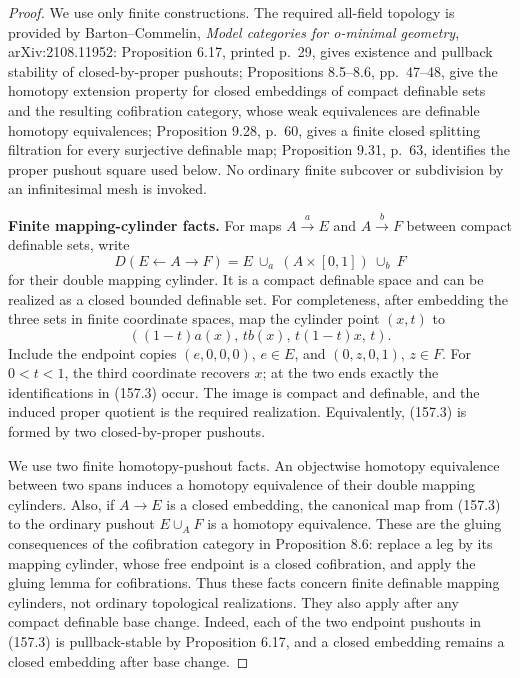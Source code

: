 \begin{proof}
We use only finite constructions. The required all-field topology is provided by Barton--Commelin, \emph{Model categories for o-minimal geometry}, arXiv:2108.11952: Proposition 6.17, printed p.~29, gives existence and pullback stability of closed-by-proper pushouts; Propositions 8.5--8.6, pp.~47--48, give the homotopy extension property for closed embeddings of compact definable sets and the resulting cofibration category, whose weak equivalences are definable homotopy equivalences; Proposition 9.28, p.~60, gives a finite closed splitting filtration for every surjective definable map; Proposition 9.31, p.~63, identifies the proper pushout square used below. No ordinary finite subcover or subdivision by an infinitesimal mesh is invoked.

\textbf{Finite mapping-cylinder facts.}
For maps \(A\xrightarrow{a}E\) and \(A\xrightarrow{b}F\) between compact definable sets, write
\[
 D(E\leftarrow A\to F)=
 E\ \cup_a\ (A\times[0,1])\ \cup_b\ F
 \tag{157.3}
\]
for their double mapping cylinder. It is a compact definable space and can be realized as a closed bounded definable set. For completeness, after embedding the three sets in finite coordinate spaces, map the cylinder point \((x,t)\) to
\[
 ((1-t)a(x),\,t b(x),\,t(1-t)x,\,t).
 \tag{157.4}
\]
Include the endpoint copies \((e,0,0,0)\), \(e\in E\), and \((0,z,0,1)\), \(z\in F\). For \(0<t<1\), the third coordinate recovers \(x\); at the two ends exactly the identifications in (157.3) occur. The image is compact and definable, and the induced proper quotient is the required realization. Equivalently, (157.3) is formed by two closed-by-proper pushouts.

We use two finite homotopy-pushout facts. An objectwise homotopy equivalence between two spans induces a homotopy equivalence of their double mapping cylinders. Also, if \(A\to E\) is a closed embedding, the canonical map from (157.3) to the ordinary pushout \(E\cup_AF\) is a homotopy equivalence. These are the gluing consequences of the cofibration category in Proposition 8.6: replace a leg by its mapping cylinder, whose free endpoint is a closed cofibration, and apply the gluing lemma for cofibrations. Thus these facts concern finite definable mapping cylinders, not ordinary topological realizations. They also apply after any compact definable base change. Indeed, each of the two endpoint pushouts in (157.3) is pullback-stable by Proposition 6.17, and a closed embedding remains a closed embedding after base change.


\end{proof}
